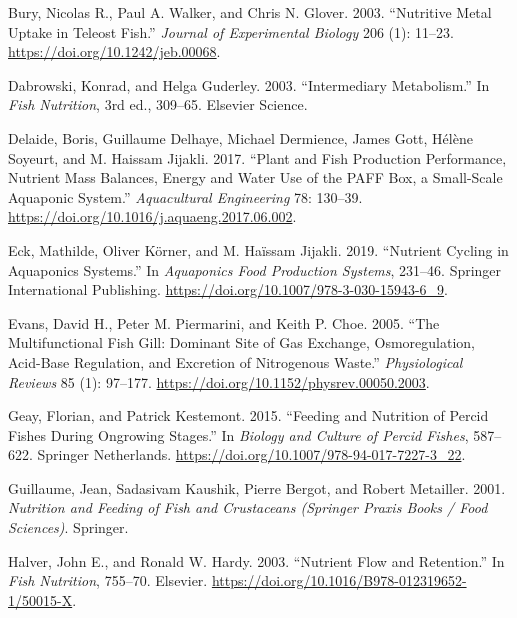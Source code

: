\documentclass[preprint, 3p,
authoryear]{elsarticle} %
\newlength{\cslhangindent}
\newlength{\cslentryspacingunit} %
\newenvironment{CSLReferences}[2] %
 {%
  \setlength{\parindent}{0pt}
  \ifodd #1
  \let\oldpar\par
  \def\par{\hangindent=\cslhangindent\oldpar}
  \fi
  \setlength{\parskip}{#2\cslentryspacingunit}
 }%
 {}
\begin{document}
\hypertarget{refs}{}
\begin{CSLReferences}{1}{0}
\leavevmode{}%
Bury, Nicolas R., Paul A. Walker, and Chris N. Glover. 2003.
{``Nutritive Metal Uptake in Teleost Fish.''} \emph{Journal of
Experimental Biology} 206 (1): 11--23.
\url{https://doi.org/10.1242/jeb.00068}.

\leavevmode{}%
Dabrowski, Konrad, and Helga Guderley. 2003. {``{Intermediary
Metabolism}.''} In \emph{Fish Nutrition}, 3rd ed., 309--65. Elsevier
Science.

\leavevmode{}%
Delaide, Boris, Guillaume Delhaye, Michael Dermience, James Gott, Hélène
Soyeurt, and M. Haissam Jijakli. 2017. {``Plant and Fish Production
Performance, Nutrient Mass Balances, Energy and Water Use of the {PAFF}
Box, a Small-Scale Aquaponic System.''} \emph{Aquacultural Engineering}
78: 130--39. \url{https://doi.org/10.1016/j.aquaeng.2017.06.002}.

\leavevmode{}%
Eck, Mathilde, Oliver Körner, and M. Haïssam Jijakli. 2019. {``{Nutrient
Cycling in Aquaponics Systems}.''} In \emph{Aquaponics Food Production
Systems}, 231--46. Springer International Publishing.
\url{https://doi.org/10.1007/978-3-030-15943-6_9}.

\leavevmode{}%
Evans, David H., Peter M. Piermarini, and Keith P. Choe. 2005. {``The
Multifunctional Fish Gill: Dominant Site of Gas Exchange,
Osmoregulation, Acid-Base Regulation, and Excretion of Nitrogenous
Waste.''} \emph{Physiological Reviews} 85 (1): 97--177.
\url{https://doi.org/10.1152/physrev.00050.2003}.

\leavevmode{}%
Geay, Florian, and Patrick Kestemont. 2015. {``Feeding and Nutrition of
Percid Fishes During Ongrowing Stages.''} In \emph{Biology and Culture
of Percid Fishes}, 587--622. Springer Netherlands.
\url{https://doi.org/10.1007/978-94-017-7227-3_22}.

\leavevmode{}%
Guillaume, Jean, Sadasivam Kaushik, Pierre Bergot, and Robert Metailler.
2001. \emph{Nutrition and Feeding of Fish and Crustaceans (Springer
Praxis Books / Food Sciences)}. Springer.

\leavevmode{}%
Halver, John E., and Ronald W. Hardy. 2003. {``Nutrient Flow and
Retention.''} In \emph{Fish Nutrition}, 755--70. Elsevier.
\url{https://doi.org/10.1016/B978-012319652-1/50015-X}.


\end{CSLReferences}
\end{document}
